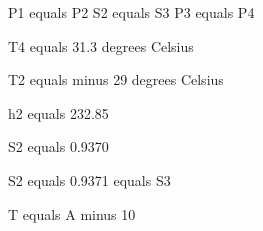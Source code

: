 P1 equals P2
S2 equals S3
P3 equals P4

T4 equals 31.3 degrees Celsius

T2 equals minus 29 degrees Celsius

h2 equals 232.85

S2 equals 0.9370

S2 equals 0.9371 equals S3

T equals A minus 10